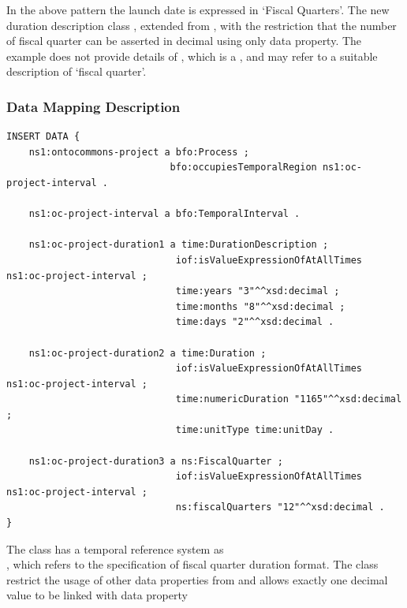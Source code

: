 In the above pattern the launch date is expressed in `Fiscal Quarters'. The new duration description class , extended from , with the restriction that the number of fiscal quarter can be asserted in decimal using only  data property. The example does not provide details of , which is a , and may refer to a suitable description of `fiscal quarter'. 


\subsubsection*{Data Mapping Description}

\begin{verbatim}
INSERT DATA {
    ns1:ontocommons-project a bfo:Process ;
                             bfo:occupiesTemporalRegion ns1:oc-project-interval .

    ns1:oc-project-interval a bfo:TemporalInterval .

    ns1:oc-project-duration1 a time:DurationDescription ;
                              iof:isValueExpressionOfAtAllTimes ns1:oc-project-interval ;
                              time:years "3"^^xsd:decimal ;
                              time:months "8"^^xsd:decimal ;
                              time:days "2"^^xsd:decimal .

    ns1:oc-project-duration2 a time:Duration ;
                              iof:isValueExpressionOfAtAllTimes ns1:oc-project-interval ;
                              time:numericDuration "1165"^^xsd:decimal ;
                              time:unitType time:unitDay .

    ns1:oc-project-duration3 a ns:FiscalQuarter ;
                              iof:isValueExpressionOfAtAllTimes ns1:oc-project-interval ;
                              ns:fiscalQuarters "12"^^xsd:decimal .
}
\end{verbatim}

The  class has a temporal reference system as \\ , which refers to the specification of fiscal quarter duration format. The class restrict the usage of other data properties from  and allows exactly one decimal value to be linked with data property 

